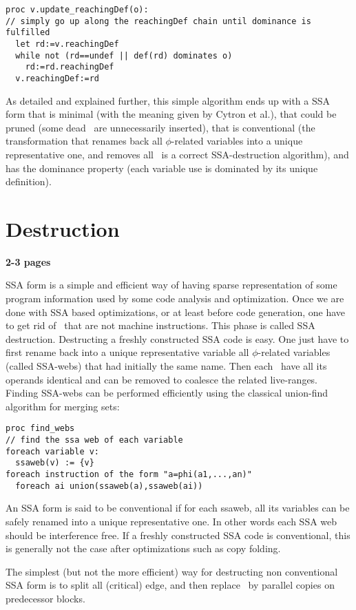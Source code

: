 \begin{verbatim}
proc v.update_reachingDef(o):
// simply go up along the reachingDef chain until dominance is fulfilled 
  let rd:=v.reachingDef
  while not (rd==undef || def(rd) dominates o)
    rd:=rd.reachingDef
  v.reachingDef:=rd
\end{verbatim}

As detailed and explained further, this simple algorithm ends up with a SSA form that is minimal (with the meaning given by Cytron et al.), that could be pruned (some dead \phiops\ are unnecessarily inserted), that is conventional (the transformation that renames back all $\phi$-related variables into a unique representative one, and removes all \phiops\ is a correct SSA-destruction algorithm), and has the dominance property (each variable use is dominated by its unique definition).
\section{Destruction }
\label{sec:classical_destruction}
\textbf{2-3 pages}

SSA form is a simple and efficient way of having sparse representation of some program information used by some code analysis and optimization. Once we are done with SSA based optimizations, or at least before code generation, one have to get rid of \phiops\ that are not machine instructions. This phase is called SSA destruction. 
Destructing a freshly constructed SSA code is easy. One just have to first rename back into a unique representative variable all $\phi$-related variables (called SSA-webs) that had initially the same name. Then each \phiop\ have all its operands identical and can be removed to coalesce the related live-ranges.
Finding SSA-webs can be performed efficiently using the classical union-find algorithm for merging sets:
\begin{verbatim}
proc find_webs
// find the ssa web of each variable
foreach variable v:
  ssaweb(v) := {v}
foreach instruction of the form "a=phi(a1,...,an)"
  foreach ai union(ssaweb(a),ssaweb(ai))
\end{verbatim}

An SSA form is said to be conventional if for each ssaweb, all its variables can be safely renamed into a unique representative one. In other words each SSA web should be interference free. If a freshly constructed SSA code is conventional, this is generally not the case after optimizations such as copy folding.

The simplest (but not the more efficient) way for destructing non conventional SSA form is to split all (critical) edge, and then replace \phiops\ by parallel copies on predecessor blocks. 

